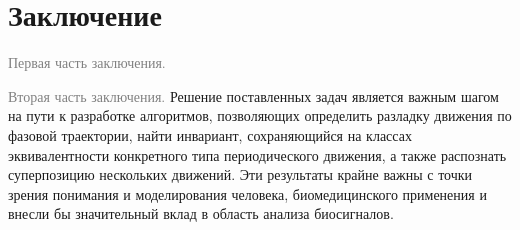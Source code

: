 \documentclass[12pt, twoside]{article}
\begin{document}
\newpage

\section{Заключение}
\textcolor{gray}{Первая часть заключения.}

\textcolor{gray}{Вторая часть заключения.} Решение поставленных задач является важным шагом на пути к разработке алгоритмов, позволяющих определить разладку движения по фазовой траектории, найти инвариант, сохраняющийся на классах эквивалентности конкретного типа периодического движения, а также распознать суперпозицию нескольких движений. Эти результаты крайне важны с точки зрения понимания и моделирования человека, биомедицинского применения и внесли бы значительный вклад в область анализа биосигналов.






\end{document}
